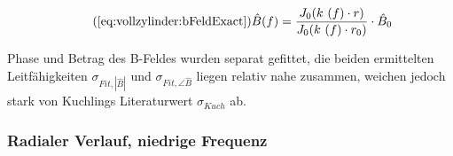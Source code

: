 {\begin{minipage}[t]{0.33\textwidth}
\begin{minipage}[t]{0.5\textwidth}
            \begin{equation}
                \tag{\ref{eq:vollzylinder:bFeldExact}}
                \hat{B} (f) = \frac{J_0 (k~(f) \cdot r)}{J_0 (k~(f) \cdot r_0)} \cdot \hat{B}_0
            \end{equation}

            Phase  und  Betrag  des  B-Feldes  wurden  separat  gefittet,  die
            beiden  ermittelten   Leitf\"ahigkeiten  $\sigma_{Fit,|\hat{B}|}$
            und  $\sigma_{Fit,\angle\hat{B}}$ liegen  relativ nahe  zusammen,
            weichen jedoch  stark von Kuchlings  Literaturwert $\sigma_{Kuch}$
            ab.

        \end{minipage}

        \vspace{1em}

        \begin{minipage}[c][][b]{0.5\textwidth}
            \vspace{0pt}
            
        \end{minipage}%
        \begin{minipage}[c][][b]{0.5\textwidth}
            \hfill
            \resizebox{\textwidth}{!}{}
            \label{fig:alu:freq:sensor}
        \end{minipage}
	\end{minipage}%
	\begin{minipage}[t]{0.67\textwidth}
        \vspace{0pt}\raggedright
        \hfill
        \resizebox{.95\textwidth}{!}{}
        \label{fig:alu:freq:exact}
	\end{minipage}


    \subsubsection{Radialer Verlauf, niedrige Frequenz}
    \label{sec:ausw:subsec:hohlz:subsubsec:steel}

}
